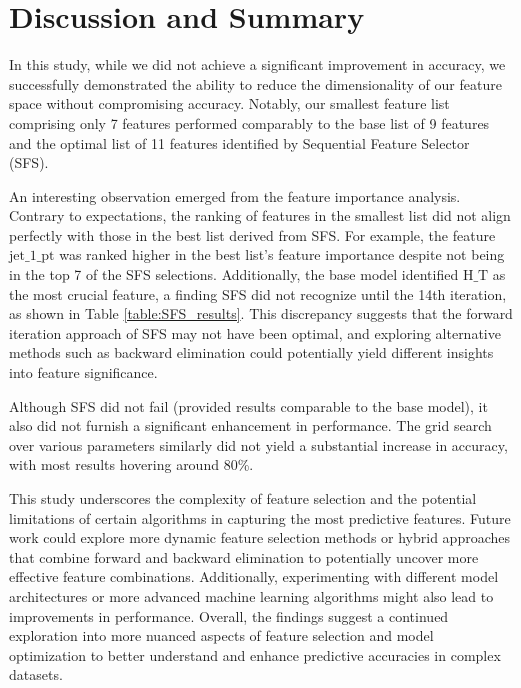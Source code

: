 \documentclass[]{article}
\begin{document}
\clearpage
\section{Discussion and Summary}

In this study, while we did not achieve a significant improvement in accuracy, we successfully demonstrated the ability to reduce the dimensionality of our feature space without compromising accuracy. Notably, our smallest feature list comprising only 7 features performed comparably to the base list of 9 features and the optimal list of 11 features identified by Sequential Feature Selector (SFS).

An interesting observation emerged from the feature importance analysis. Contrary to expectations, the ranking of features in the smallest list did not align perfectly with those in the best list derived from SFS. For example, the feature $\mathrm{jet\_1\_pt}$ was ranked higher in the best list's feature importance despite not being in the top 7 of the SFS selections. Additionally, the base model identified $\mathrm{H\_T}$ as the most crucial feature, a finding SFS did not recognize until the 14th iteration, as shown in Table \ref{table:SFS_results}. This discrepancy suggests that the forward iteration approach of SFS may not have been optimal, and exploring alternative methods such as backward elimination could potentially yield different insights into feature significance.

Although SFS did not fail (provided results comparable to the base model), it also did not furnish a significant enhancement in performance. The grid search over various parameters similarly did not yield a substantial increase in accuracy, with most results hovering around 80\%.


This study underscores the complexity of feature selection and the potential limitations of certain algorithms in capturing the most predictive features. Future work could explore more dynamic feature selection methods or hybrid approaches that combine forward and backward elimination to potentially uncover more effective feature combinations. Additionally, experimenting with different model architectures or more advanced machine learning algorithms might also lead to improvements in performance. Overall, the findings suggest a continued exploration into more nuanced aspects of feature selection and model optimization to better understand and enhance predictive accuracies in complex datasets.
\appendix

\clearpage
\end{document}
